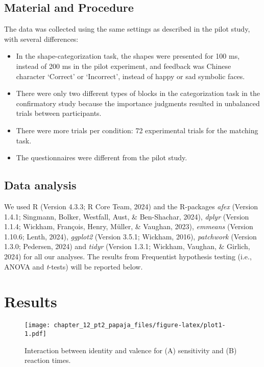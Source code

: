 \documentclass[
  man]{apa6}
\providecommand{\tightlist}{%
  \setlength{\itemsep}{0pt}\setlength{\parskip}{0pt}}
\begin{document}
\subsection{Material and Procedure}\label{material-and-procedure}

The data was collected using the same settings as described in the pilot study, with several differences:

\begin{itemize}
\tightlist
\item
  In the shape-categorization task, the shapes were presented for 100 ms, instead of 200 ms in the pilot experiment, and feedback was Chinese character `Correct' or `Incorrect', instead of happy or sad symbolic faces.
\item
  There were only two different types of blocks in the categorization task in the confirmatory study because the importance judgments resulted in unbalanced trials between participants.
\item
  There were more trials per condition: 72 experimental trials for the matching task.
\item
  The questionnaires were different from the pilot study.
\end{itemize}

\subsection{Data analysis}\label{data-analysis}

We used R (Version 4.3.3; R Core Team, 2024) and the R-packages \emph{afex} (Version 1.4.1; Singmann, Bolker, Westfall, Aust, \& Ben-Shachar, 2024), \emph{dplyr} (Version 1.1.4; Wickham, François, Henry, Müller, \& Vaughan, 2023), \emph{emmeans} (Version 1.10.6; Lenth, 2024), \emph{ggplot2} (Version 3.5.1; Wickham, 2016), \emph{patchwork} (Version 1.3.0; Pedersen, 2024) and \emph{tidyr} (Version 1.3.1; Wickham, Vaughan, \& Girlich, 2024) for all our analyses. The results from Frequentist hypothesis testing (i.e., ANOVA and \emph{t}-tests) will be reported below.

\section{Results}\label{results}

\begin{figure}
\centering
\texttt{[image: chapter\_12\_pt2\_papaja\_files/figure-latex/plot1-1.pdf]}
\caption{\label{fig:plot1}Interaction between identity and valence for (A) sensitivity and (B) reaction times.}
\end{figure}
\end{document}
